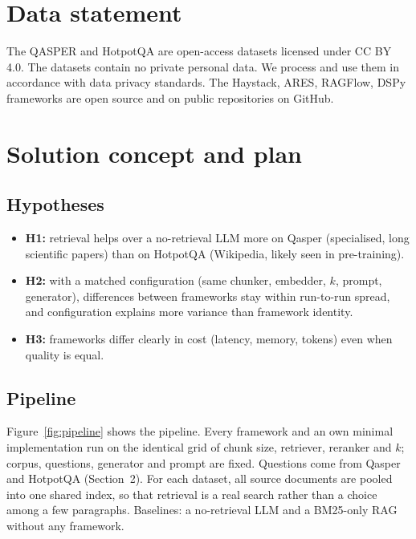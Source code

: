 \documentclass[11pt]{article}
\begin{document}
\section{Data statement}
The QASPER and HotpotQA are open-access datasets licensed under CC BY 4.0. The datasets contain no private personal data. We process and use them in accordance with data privacy standards.
The Haystack, ARES, RAGFlow, DSPy frameworks are open source and on public repositories on GitHub.

\section{Solution concept and plan}

\subsection{Hypotheses}
\begin{itemize}
    \item \textbf{H1:} retrieval helps over a no-retrieval LLM more on Qasper (specialised, long scientific papers) than on HotpotQA (Wikipedia, likely seen in pre-training).
    \item \textbf{H2:} with a matched configuration (same chunker, embedder, $k$, prompt, generator), differences between frameworks stay within run-to-run spread, and configuration explains more variance than framework identity.
    \item \textbf{H3:} frameworks differ clearly in cost (latency, memory, tokens) even when quality is equal.
\end{itemize}


\subsection{Pipeline}
Figure~\ref{fig:pipeline} shows the pipeline. Every framework and an own minimal implementation run on the identical grid of chunk size, retriever, reranker and $k$; corpus, questions, generator and prompt are fixed. Questions come from Qasper and HotpotQA (Section~2). For each dataset, all source documents are pooled into one shared index, so that retrieval is a real search rather than a choice among a few paragraphs. Baselines: a no-retrieval LLM and a BM25-only RAG without any framework.
\end{document}
